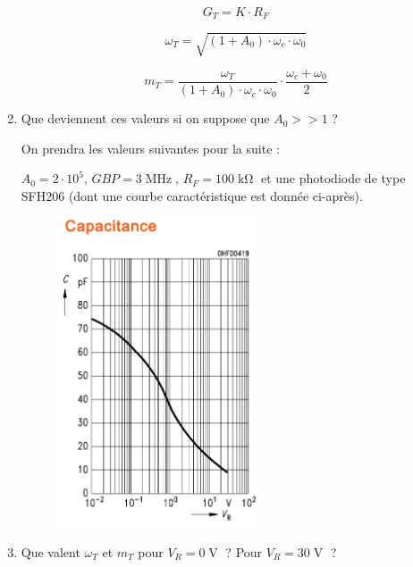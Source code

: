 \begin{enumerate}
{	$$G_T = K \cdot R_F$$
	
	$$\omega_T = \sqrt{(1 + A_0) \cdot \omega_c \cdot \omega_0}$$
	
	$$m_T = \frac{\omega_T}{(1 + A_0) \cdot \omega_c \cdot \omega_0} \cdot \frac{\omega_c + \omega_0}{2}$$
}
	\item Que deviennent ces valeurs si on suppose que $A_0 >> 1$ ?

	On prendra les valeurs suivantes pour la suite :
	
	$A_0 = 2 \cdot 10^5$, $GBP = 3\operatorname{MHz}$, $R_F = 100\operatorname{k\Omega}$ et une photodiode de type SFH206 (dont une courbe caractéristique est donnée ci-après).
	
\begin{figure}[!h]
	\centering
	\includegraphics[width=6cm]{images/TD/SFH206_capa.png}
\end{figure}
	
	\item Que valent $\omega_T$ et $m_T$ pour $V_R = 0\operatorname{V}$ ? Pour $V_R = 30\operatorname{V}$ ?
\end{enumerate}
